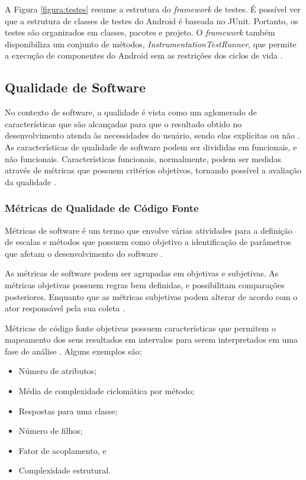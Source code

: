 A Figura \ref{figura:testes} resume a estrutura do \textit{framework} de
testes. É possível ver que a estrutura de classes de testes do Android é
baseada no JUnit. Portanto, os testes são organizados em classes, pacotes e
projeto. O \textit{framework} também disponibiliza um conjunto de métodos,
\textit{InstrumentationTestRunner}, que permite a execução de componentes do
Android sem as restrições dos ciclos de vida \cite{androidTesting2015}.


  \subsection{Qualidade de Software}
  \label{subsec:qualidadedesoftware}

No contexto de software, a qualidade é vista como um aglomerado de
características que são alcançadas para que o resultado obtido no
desenvolvimento atenda às necessidades do usuário, sendo elas explícitas ou não
\cite{rocha2001}. As características de qualidade de software podem ser
divididas em funcionais, e não funcionais. Características funcionais,
normalmente, podem ser medidas através de métricas que possuem critérios
objetivos, tornando possível a avaliação da qualidade \cite{meirelles2013}.

    \subsubsection{Métricas de Qualidade de Código Fonte}

Métricas de software é um termo que envolve várias atividades para a definição
de escalas e métodos que possuem como objetivo a identificação de parâmetros
que afetam o desenvolvimento do software \cite{metrics}.

As métricas de software podem ser agrupadas em objetivas e subjetivas. As
métricas objetivas possuem regras bem definidas, e possibilitam comparações
posteriores. Enquanto que as métricas subjetivas podem alterar de acordo com o
ator responsável pela sua coleta \cite{meirelles2013}.

Métricas de código fonte objetivas possuem características que permitem o
mapeamento dos seus resultados em intervalos para serem interpretados em uma
fase de análise \cite{meirelles2013}. Alguns exemplos são:

\begin{itemize}
  \item Número de atributos;
  \item Média de complexidade ciclomática por método;
  \item Respostas para uma classe;
  \item Número de filhos;
  \item Fator de acoplamento, e
  \item Complexidade estrutural.
\end{itemize}

